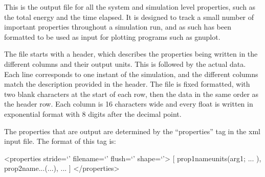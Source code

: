 \documentclass[11pt,english,fleqn]{report}
\newenvironment{code}{%
\footnotesize 
\verbatim
}{
\endverbatim
\normalsize
}
\begin{document}
\label{propertyfile}

This is the output file for all the system and simulation level properties,
such as the total energy and the time elapsed. It is designed to 
track a small number of important properties throughout a
simulation run, and as such has been formatted to be used as input
for plotting programs such as gnuplot.

The file starts with
a header, which describes the properties being written in the different
columns and their output units. This is followed by the actual
data. Each line corresponds to one instant of the simulation, and
the different columns match the description provided in the header.
The file is fixed formatted, with two blank characters at the start
of each row, then the data in the same order as the header row. Each
column is 16 characters wide and every float is written in exponential
format with 8 digits after the decimal point.


The properties that are output are determined by the {}``properties''
tag in the xml input file. The format of this tag is:

\begin{code}<properties stride=`' filename=`' flush=`' shape=`'>
   [ prop1name{units}(arg1; ... ), prop2name{...}(...), ...  ]
</properties>\end{code}
\end{document}
